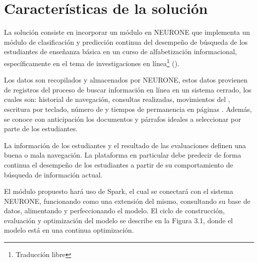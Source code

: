 \section{Características de la solución}
\label{sec:caracteristicas-solucion}
La solución consiste en incorporar un módulo en NEURONE \parencite{gonzalez2017neurone} que implementa un módulo de clasificación y predicción continua del desempeño de búsqueda de los estudiantes de enseñanza básica en un curso de alfabetización informacional, específicamente en el tema de investigaciones en línea\footnote{Traducción libre} (). 

Los datos son recopilados y almacenados por NEURONE, estos datos provienen de registros del proceso de buscar información en línea en un sistema cerrado, los cuales son: historial de navegación, consultas realizadas, movimientos del , escritura por teclado, número de  y tiempos de permanencia en páginas . Además, se conoce con anticipación los documentos y párrafos ideales a seleccionar por parte de los estudiantes.

La información de los estudiantes y el resultado de las evaluaciones definen una buena o mala navegación. La plataforma en particular debe predecir de forma continua el desempeño de los estudiantes a partir de su comportamiento de búsqueda de información actual.

El módulo propuesto hará uso de Spark, el cual se conectará con el sistema NEURONE, funcionando como una extensión del mismo, consultando su base de datos, alimentando y perfeccionando el modelo. El ciclo de construcción, evaluación y optimización del modelo se describe en la Figura 3.1, donde el modelo está en una continua optimización.


\begin{figure}[htb]
	\centering
	
	\label{fig:docente_estudiante}
\end{figure}

\begin{figure}[htb]
	\centering
	
	\label{fig:ml-pipeline}
\end{figure}



